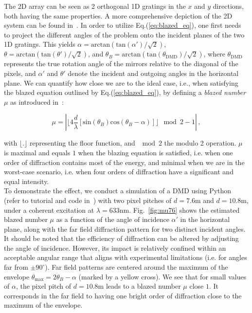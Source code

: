 \documentclass[12pt]{iopart}
\begin{document}
The 2D array can be seen as 2 orthogonal 1D gratings in the $x$ and $y$ directions,
both having the same properties.
A more comprehensive depiction of the 2D system can be found in~\cite{Scholes2019structured}.
In order to utilize Eq.(\ref{eq:blazed_eq}),
one first needs to project
the different angles of the problem onto the incident planes
of the two 1D gratings.
This yields
$\alpha = \text{arctan}\left(\text{tan}(\alpha')/\sqrt{2}\right)$,
$\theta = \text{arctan}\left(\text{tan}(\theta')/\sqrt{2}\right)$,
and $\theta_B = \text{arctan}\left(\text{tan}(\theta_\text{DMD})/\sqrt{2}\right)$,
where $\theta_\text{DMD}$ represents the true rotation angle of the mirrors relative to the diagonal of the pixels,
and $\alpha'$ and $\theta'$ denote the incident and outgoing angles in the horizontal plane.
We can quantify how close we are to the ideal case,
i.e., when satisfying the blazed equation outlined by Eq.(\ref{eq:blazed_eq}),
by defining a {\em blazed number} $\mu$ as introduced in~\cite{WFSnet_diffraction}:



\begin{equation}
  \mu =
  \left|
  \lfloor 4 \frac{d}{\lambda}
  \left[
    \text{sin}(\theta_B)\text{cos}(\theta_B-\alpha)
    \right]
  \rfloor
  \mod{2} -1
  \right| \, ,
  \label{eq:blazed_number}
\end{equation}

with $\lfloor . \rfloor$ representing the floor function,
and $\mod{2}$ the modulo 2 operation.
$\mu$ is maximal and equals $1$ when the blazing equation is satisfied,
i.e. when one order of diffraction contains most of the energy,
and minimal when we are in the worst-case scenario,
i.e. when four orders of diffraction have a significant and equal intensity.\\


To demonstrate the effect, we conduct a simulation of a DMD using Python
(refer to tutorial and code in~\cite{WFSnet_diffraction})
with two pixel pitches of
$d=7.6$\textmu m and $d=10.8$\textmu m,
under a coherent excitation at $\lambda=633$nm.
Fig.~\ref{fig:mu76} shows the estimated blazed number $\mu$
as a function of the angle of incidence $\alpha'$ in the horizontal plane,
along with the far field diffraction pattern for two distinct incident angles.
It should be noted that the efficiency of diffraction can be altered by adjusting
the angle of incidence.
However, its impact is relatively confined
within an acceptable angular range that aligns with experimental limitations
(i.e. for angles far from $\pm 90^\circ$).
Far field patterns are centered around the maximum of the envelope
$\theta_\text{max} = 2\theta_B - \alpha$
(marked by a yellow cross).
We see that for small values of $\alpha$,
the pixel pitch of $d=10.8$\textmu m leads to a blazed number $\mu$
close $1$.
It corresponds in the far field to having one bright order of diffraction
close to the maximum of the envelope.
\end{document}
